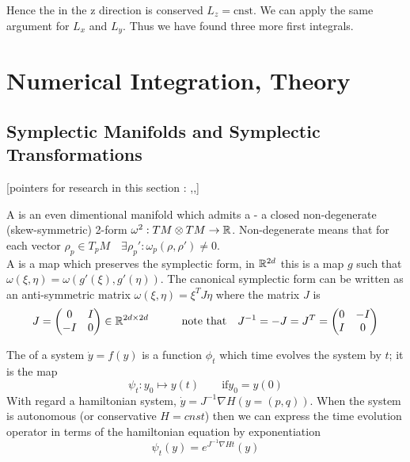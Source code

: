 \documentclass[12pt]{article}
\begin{document}
Hence the  in the z direction is conserved $L_z = \text{cnst}$. We can apply the same argument for $L_x$ and $L_y$. Thus we have found three more first integrals.

\section{Numerical Integration, Theory}


\subsection{Symplectic Manifolds and Symplectic Transformations}
[pointers for research in this section : \cite{Omar},\cite{Numerical},\cite{Duruisseaux}]

A  is an even dimentional manifold which admits a  - a closed non-degenerate (skew-symmetric) 2-form $\omega^2 : TM\otimes TM \to \mathbb{R}$. Non-degenerate means that for each vector $\rho_p\in T_p M\quad \exists \rho_p' : \omega_p(\rho,\rho')\neq 0$. \\

A  is a map which preserves the symplectic form, in $\mathbb{R}^{2d}$ this is a map $g$ such that $\omega(\xi,\eta) = \omega(g'(\xi),g'(\eta))$. The canonical symplectic form can be written as an anti-symmetric matrix $\omega(\xi,\eta) = \xi^T J \eta$ where the matrix $J$ is
\begin{equation}\label{eq:matrix J}
    J = \begin{pmatrix} 0 & I\\ -I& 0 \end{pmatrix}\in \mathbb{R}^{2d\times 2d}\qquad\quad \text{note that}\quad J^{-1} = -J = J^T = \begin{pmatrix} 0& -I\\ I&0 \end{pmatrix}
\end{equation}

The  of a system $\dot y = f(y)$ is a function $\phi_t$ which time evolves the system by $t$; it is the map
\begin{equation}\label{eq:flow}\psi_t : y_0\mapsto y(t)\qquad \text{if} y_0 = y(0)\end{equation}
With regard a hamiltonian system, $\dot y = J^{-1}\nabla H(y=(p,q))$. When the system is autonomous (or conservative $H = cnst$) then we can express the time evolution operator in terms of the hamiltonian equation by exponentiation
\begin{equation}\label{eq:time evolution autonomous hamiltonian}
    \psi_t(y) = e^{J^{-1}\nabla H t}(y)
\end{equation}
\end{document}
